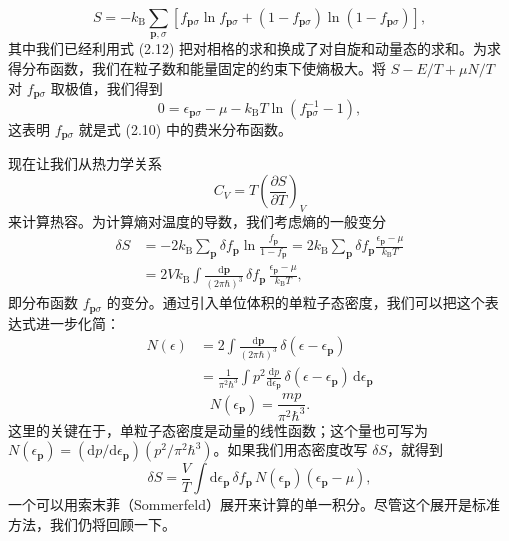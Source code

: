 \begin{equation*}
S=-k_{\mathrm{B}}\sum_{\mathbf{p},\sigma}\left[f_{\mathbf{p}\sigma}\ln f_{\mathbf{p}\sigma}+(1-f_{\mathbf{p}\sigma})\ln(1-f_{\mathbf{p}\sigma})\right],
\tag{2.16}
\end{equation*}
其中我们已经利用式 (2.12) 把对相格的求和换成了对自旋和动量态的求和。为求得分布函数，我们在粒子数和能量固定的约束下使熵极大。将 $S-E/T+\mu N/T$ 对 $f_{\mathbf{p}\sigma}$ 取极值，我们得到
\begin{equation*}
0=\epsilon_{\mathbf{p}\sigma}-\mu-k_{\mathrm{B}}T\ln\left(f_{\mathbf{p}\sigma}^{-1}-1\right),
\tag{2.17}
\end{equation*}
这表明 $f_{\mathbf{p}\sigma}$ 就是式 (2.10) 中的费米分布函数。

现在让我们从热力学关系
\begin{equation*}
C_{V}=T\left(\frac{\partial S}{\partial T}\right)_{V}
\tag{2.18}
\end{equation*}
来计算热容。为计算熵对温度的导数，我们考虑熵的一般变分
\begin{align*}
\delta S&=-2k_{\mathrm{B}}\sum_{\mathbf{p}}\delta f_{\mathbf{p}}\ln\frac{f_{\mathbf{p}}}{1-f_{\mathbf{p}}}=2k_{\mathrm{B}}\sum_{\mathbf{p}}\delta f_{\mathbf{p}}\frac{\epsilon_{\mathbf{p}}-\mu}{k_{\mathrm{B}}T}
\tag{2.19}\\
&=2Vk_{\mathrm{B}}\int\frac{\mathrm{d}\mathbf{p}}{(2\pi\hbar)^{3}}\,\delta f_{\mathbf{p}}\,\frac{\epsilon_{\mathbf{p}}-\mu}{k_{\mathrm{B}}T},
\tag{2.20}
\end{align*}
即分布函数 $f_{\mathbf{p}\sigma}$ 的变分。通过引入单位体积的单粒子态密度，我们可以把这个表达式进一步化简：
\begin{align*}
N(\epsilon)&=2\int\frac{\mathrm{d}\mathbf{p}}{(2\pi\hbar)^{3}}\,\delta(\epsilon-\epsilon_{\mathbf{p}})
\tag{2.21}\\
&=\frac{1}{\pi^{2}\hbar^{3}}\int p^{2}\frac{\mathrm{d}p}{\mathrm{d}\epsilon_{\mathbf{p}}}\,\delta(\epsilon-\epsilon_{\mathbf{p}})\,\mathrm{d}\epsilon_{\mathbf{p}}
\tag{2.22}
\end{align*}
\begin{equation*}
N(\epsilon_{\mathbf{p}})=\frac{mp}{\pi^{2}\hbar^{3}}.
\tag{2.23}
\end{equation*}
这里的关键在于，单粒子态密度是动量的线性函数；这个量也可写为 $N(\epsilon_{\mathbf{p}})=(\mathrm{d}p/\mathrm{d}\epsilon_{\mathbf{p}})(p^{2}/\pi^{2}\hbar^{3})$。如果我们用态密度改写 $\delta S$，就得到
\begin{equation*}
\delta S=\frac{V}{T}\int\mathrm{d}\epsilon_{\mathbf{p}}\,\delta f_{\mathbf{p}}\,N(\epsilon_{\mathbf{p}})(\epsilon_{\mathbf{p}}-\mu),
\tag{2.24}
\end{equation*}
一个可以用索末菲（Sommerfeld）展开来计算的单一积分。尽管这个展开是标准方法，我们仍将回顾一下。

